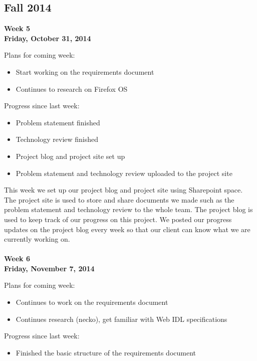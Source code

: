 \subsection{Fall 2014}
\textbf{Week 5\\Friday, October 31, 2014\\}

\noindent Plans for coming week:
\begin{itemize}
\item Start working on the requirements document
\item Continues to research on Firefox OS
\end{itemize}

\noindent Progress since last week:
\begin{itemize}
\item Problem statement finished
\item Technology review finished
\item Project blog and project site set up
\item Problem statement and technology review uploaded to the project site
\end{itemize}

\noindent This week we set up our project blog and project site using Sharepoint space. The project site is used to store and share documents we made such as the problem statement and technology review to the whole team. The project blog is used to keep track of our progress on this project. We posted our progress updates on the project blog every week so that our client can know what we are currently working on. \\
\\
\textbf{Week 6\\Friday, November 7, 2014\\}

\noindent Plans for coming week:
\begin{itemize}
\item Continues to work on the requirements document
\item Continues research (necko), get familiar with Web IDL specifications
\end{itemize}

\noindent Progress since last week:
\begin{itemize}
\item Finished the basic structure of the requirements document
\end{itemize}

